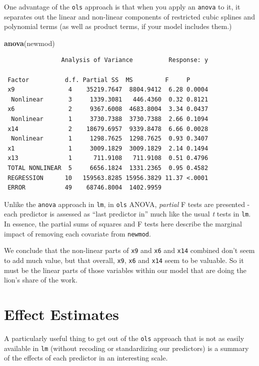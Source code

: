 \documentclass[]{book}
\newenvironment{Shaded}{\begin{snugshade}}{\end{snugshade}}
\newcommand{\KeywordTok}[1]{\textcolor[rgb]{0.13,0.29,0.53}{\textbf{#1}}}
\newcommand{\NormalTok}[1]{#1}
\theoremstyle{definition}
\theoremstyle{definition}
\theoremstyle{definition}
\theoremstyle{remark}
\begin{document}
One advantage of the \texttt{ols} approach is that when you apply an
\texttt{anova} to it, it separates out the linear and non-linear
components of restricted cubic splines and polynomial terms (as well as
product terms, if your model includes them.)

\begin{Shaded}
\begin{Highlighting}[]
\KeywordTok{anova}\NormalTok{(newmod)}
\end{Highlighting}
\end{Shaded}

\begin{verbatim}
                Analysis of Variance          Response: y 

 Factor          d.f. Partial SS  MS         F     P     
 x9               4    35219.7647  8804.9412  6.28 0.0004
  Nonlinear       3     1339.3081   446.4360  0.32 0.8121
 x6               2     9367.6008  4683.8004  3.34 0.0437
  Nonlinear       1     3730.7388  3730.7388  2.66 0.1094
 x14              2    18679.6957  9339.8478  6.66 0.0028
  Nonlinear       1     1298.7625  1298.7625  0.93 0.3407
 x1               1     3009.1829  3009.1829  2.14 0.1494
 x13              1      711.9108   711.9108  0.51 0.4796
 TOTAL NONLINEAR  5     6656.1824  1331.2365  0.95 0.4582
 REGRESSION      10   159563.8285 15956.3829 11.37 <.0001
 ERROR           49    68746.8004  1402.9959             
\end{verbatim}

Unlike the \texttt{anova} approach in \texttt{lm}, in \texttt{ols}
ANOVA, \emph{partial} F tests are presented - each predictor is assessed
as ``last predictor in'' much like the usual \emph{t} tests in
\texttt{lm}. In essence, the partial sums of squares and F tests here
describe the marginal impact of removing each covariate from
\texttt{newmod}.

We conclude that the non-linear parts of \texttt{x9} and \texttt{x6} and
\texttt{x14} combined don't seem to add much value, but that overall,
\texttt{x9}, \texttt{x6} and \texttt{x14} seem to be valuable. So it
must be the linear parts of those variables within our model that are
doing the lion's share of the work.

\section{Effect Estimates}\label{effect-estimates}

A particularly useful thing to get out of the \texttt{ols} approach that
is not as easily available in \texttt{lm} (without recoding or
standardizing our predictors) is a summary of the effects of each
predictor in an interesting scale.
\end{document}
